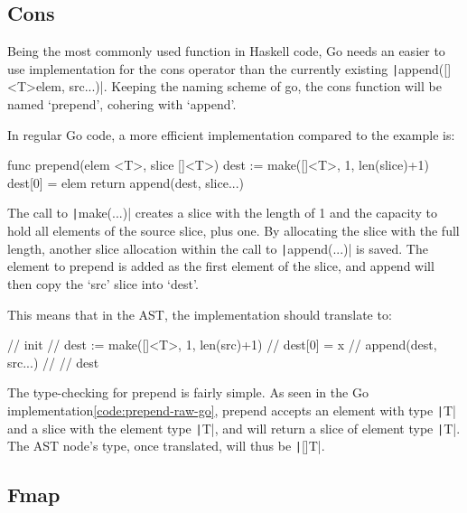 \subsection{Cons}

Being the most commonly used function in Haskell code, Go needs an easier to use implementation for the cons operator
than the currently existing \texttt|append([]<T>{elem}, src...)|. Keeping the naming scheme of go, the cons
function will be named `prepend', cohering with `append'.

In regular Go code, a more efficient implementation compared to the example is:
\begin{code}
\label{code:prepend-raw-go}
\begin{gocode}
func prepend(elem <T>, slice []<T>) {
    dest := make([]<T>, 1, len(slice)+1)
    dest[0] = elem
    return append(dest, slice...)
}
\end{gocode}
\end{code}

The call to \texttt|make(...)| creates a slice with the length of 1 and the capacity
to hold all elements of the source slice, plus one. By allocating the slice with the full
length, another slice allocation within the call to \texttt|append(...)| is saved.
The element to prepend is added as the first element of the slice, and append will then
copy the `src' slice into `dest'.

This means that in the AST, the implementation should translate to:
\begin{code}
\begin{gocode}
//   init {
//     dest := make([]<T>, 1, len(src)+1)
//     dest[0] = x
//     append(dest, src...)
//   }
//   dest
\end{gocode}
\end{code}

The type-checking for prepend is fairly simple. As seen in the Go implementation\ref{code:prepend-raw-go},
prepend accepts an element with type \texttt|T| and a slice with the element type \texttt|T|,
and will return a slice of element type \texttt|T|. The AST node's type, once translated,
will thus be \texttt|[]T|.

\subsection{Fmap}

